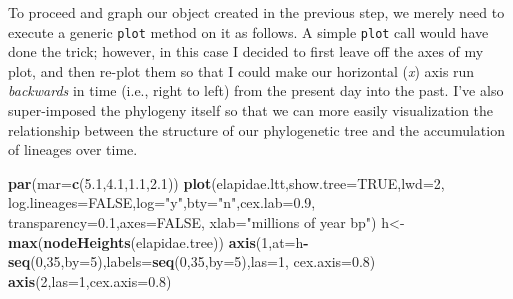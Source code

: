 \documentclass[fleqn,10pt,lineno]{wlpeerj} %
\newenvironment{Shaded}{\begin{snugshade}}{\end{snugshade}}
\newcommand{\AttributeTok}[1]{\textcolor[rgb]{0.13,0.29,0.53}{#1}}
\newcommand{\ConstantTok}[1]{\textcolor[rgb]{0.56,0.35,0.01}{#1}}
\newcommand{\DecValTok}[1]{\textcolor[rgb]{0.00,0.00,0.81}{#1}}
\newcommand{\FloatTok}[1]{\textcolor[rgb]{0.00,0.00,0.81}{#1}}
\newcommand{\FunctionTok}[1]{\textcolor[rgb]{0.13,0.29,0.53}{\textbf{#1}}}
\newcommand{\NormalTok}[1]{#1}
\newcommand{\OtherTok}[1]{\textcolor[rgb]{0.56,0.35,0.01}{#1}}
\newcommand{\SpecialCharTok}[1]{\textcolor[rgb]{0.81,0.36,0.00}{\textbf{#1}}}
\newcommand{\StringTok}[1]{\textcolor[rgb]{0.31,0.60,0.02}{#1}}
\begin{document}
To proceed and graph our object created in the previous step, we merely need to execute a generic \texttt{plot} method on it as follows. A simple \texttt{plot} call would have done the trick; however, in this case I decided to first leave off the axes of my plot, and then re-plot them so that I could make our horizontal (\emph{x}) axis run \emph{backwards} in time (i.e., right to left) from the present day into the past. I've also super-imposed the phylogeny itself so that we can more easily visualization the relationship between the structure of our phylogenetic tree and the accumulation of lineages over time.

\begin{Shaded}
\begin{Highlighting}[]
\FunctionTok{par}\NormalTok{(}\AttributeTok{mar=}\FunctionTok{c}\NormalTok{(}\FloatTok{5.1}\NormalTok{,}\FloatTok{4.1}\NormalTok{,}\FloatTok{1.1}\NormalTok{,}\FloatTok{2.1}\NormalTok{))}
\FunctionTok{plot}\NormalTok{(elapidae.ltt,}\AttributeTok{show.tree=}\ConstantTok{TRUE}\NormalTok{,}\AttributeTok{lwd=}\DecValTok{2}\NormalTok{,}
  \AttributeTok{log.lineages=}\ConstantTok{FALSE}\NormalTok{,}\AttributeTok{log=}\StringTok{"y"}\NormalTok{,}\AttributeTok{bty=}\StringTok{"n"}\NormalTok{,}\AttributeTok{cex.lab=}\FloatTok{0.9}\NormalTok{,}
  \AttributeTok{transparency=}\FloatTok{0.1}\NormalTok{,}\AttributeTok{axes=}\ConstantTok{FALSE}\NormalTok{,}
  \AttributeTok{xlab=}\StringTok{"millions of year bp"}\NormalTok{)}
\NormalTok{h}\OtherTok{\textless{}{-}}\FunctionTok{max}\NormalTok{(}\FunctionTok{nodeHeights}\NormalTok{(elapidae.tree))}
\FunctionTok{axis}\NormalTok{(}\DecValTok{1}\NormalTok{,}\AttributeTok{at=}\NormalTok{h}\SpecialCharTok{{-}}\FunctionTok{seq}\NormalTok{(}\DecValTok{0}\NormalTok{,}\DecValTok{35}\NormalTok{,}\AttributeTok{by=}\DecValTok{5}\NormalTok{),}\AttributeTok{labels=}\FunctionTok{seq}\NormalTok{(}\DecValTok{0}\NormalTok{,}\DecValTok{35}\NormalTok{,}\AttributeTok{by=}\DecValTok{5}\NormalTok{),}\AttributeTok{las=}\DecValTok{1}\NormalTok{,}
  \AttributeTok{cex.axis=}\FloatTok{0.8}\NormalTok{)}
\FunctionTok{axis}\NormalTok{(}\DecValTok{2}\NormalTok{,}\AttributeTok{las=}\DecValTok{1}\NormalTok{,}\AttributeTok{cex.axis=}\FloatTok{0.8}\NormalTok{)}
\end{Highlighting}
\end{Shaded}
\end{document}
